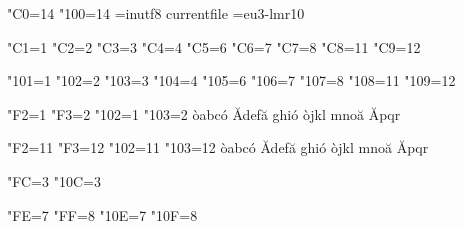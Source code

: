 

\ifx\kcatcode\undefined\else
  \kcatcode"C0=14  %
  \kcatcode"100=14 %
\fi
\ifx\ocp\undefined\else
  \ocp\ORGin=inutf8
  \InputTranslation currentfile \ORGin
\fi
\font\x=eu3-lmr10 \x
\parindent0pt

\catcode"C1=1
\catcode"C2=2
\catcode"C3=3
\catcode"C4=4
\catcode"C5=6
\catcode"C6=7
\catcode"C7=8
\catcode"C8=11
\catcode"C9=12
\immediate{}%
\immediate{}%
\immediate{}%
\immediate{}%
\immediate{}%
\immediate{}%
\immediate{}%
\immediate{}%

\catcode"101=1
\catcode"102=2
\catcode"103=3
\catcode"104=4
\catcode"105=6
\catcode"106=7
\catcode"107=8
\catcode"108=11
\catcode"109=12
\immediate{}%
\immediate{}%
\immediate{}%
\immediate{}%
\immediate{}%
\immediate{}%
\immediate{}%
\immediate{}%


\catcode"F2=1  %
\catcode"F3=2  %
\catcode"102=1 %
\catcode"103=2 %
òabcó Ădefă {ghió òjkl} {mnoă Ăpqr}

\catcode"F2=11
\catcode"F3=12
\catcode"102=11
\catcode"103=12
òabcó Ădefă {ghió òjkl} {mnoă Ăpqr}

\catcode"FC=3  %
\catcode"10C=3 %
\immediate{}%
\immediate{}%

\catcode"FE=7  %
\catcode"FF=8  %
\catcode"10E=7 %
\catcode"10F=8 %
\immediate{}%
\immediate{}%

